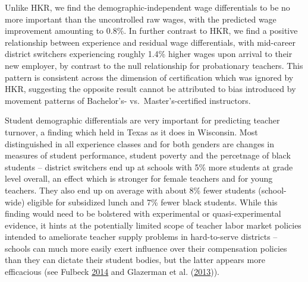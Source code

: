\documentclass[12pt,]{article}
\begin{document}
Unlike HKR, we find the demographic-independent wage differentials to be
no more important than the uncontrolled raw wages, with the predicted
wage improvement amounting to 0.8\%. In further contrast to HKR, we find
a positive relationship between experience and residual wage
differentials, with mid-career district switchers experiencing roughly
1.4\% higher wages upon arrival to their new employer, by contrast to
the null relationship for probationary teachers. This pattern is
consistent across the dimension of certification which was ignored by
HKR, suggesting the opposite result cannot be attributed to bias
introduced by movement patterns of Bachelor's- vs.~Master's-certified
instructors.

Student demographic differentials are very important for predicting
teacher turnover, a finding which held in Texas as it does in Wisconsin.
Most distinguished in all experience classes and for both genders are
changes in measures of student performance, student poverty and the
percetnage of black students -- district switchers end up at schools
with 5\% more students at grade level overall, an effect which is
stronger for female teachers and for young teachers. They also end up on
average with about 8\% fewer students (school-wide) eligible for
subsidized lunch and 7\% fewer black students. While this finding would
need to be bolstered with experimental or quasi-experimental evidence,
it hints at the potentially limited scope of teacher labor market
policies intended to ameliorate teacher supply problems in hard-to-serve
districts -- schools can much more easily exert influence over their
compensation policies than they can dictate their student bodies, but
the latter appears more efficacious (see Fulbeck
\protect\hyperlink{ref-fulbeck}{2014} and Glazerman et al.
(\protect\hyperlink{ref-glazerman}{2013})).
\end{document}
